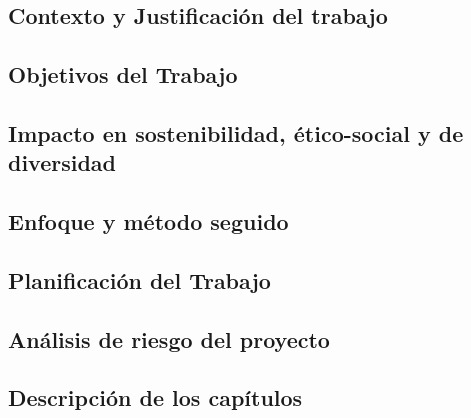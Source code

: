 \documentclass[12pt,a4paper]{article}
\begin{document}
\subsection{Contexto y Justificación del trabajo}                        %
\subsection{Objetivos del Trabajo}                                       %
\subsection{Impacto en sostenibilidad, ético-social y de diversidad}     %
\subsection{Enfoque y método seguido}                                    %
\subsection{Planificación del Trabajo}                                   %
\subsection{Análisis de riesgo del proyecto}                             %
\subsection{Descripción de los capítulos}                                %
\end{document}
